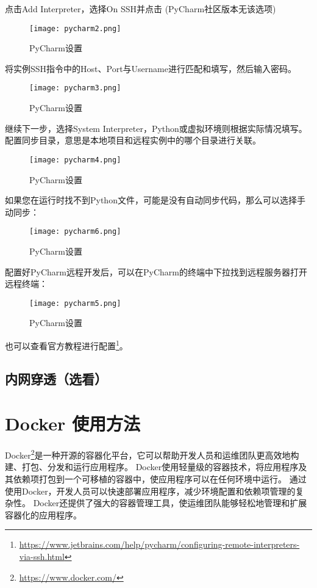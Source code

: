 \documentclass[lang=cn,a4paper,newtx]{elegantpaper}
\begin{document}
点击Add Interpreter，选择On SSH并点击 (PyCharm社区版本无该选项)
\begin{figure}[hbpt]
  \centering
  \texttt{[image: pycharm2.png]}
  \caption{PyCharm设置}
  \label{fig:pycharm2}
\end{figure}

将实例SSH指令中的Host、Port与Username进行匹配和填写，然后输入密码。
\begin{figure}[hbpt]
  \centering
  \texttt{[image: pycharm3.png]}
  \caption{PyCharm设置}
  \label{fig:pycharm3}
\end{figure}

\newpage
继续下一步，选择System Interpreter，Python或虚拟环境则根据实际情况填写。
配置同步目录，意思是本地项目和远程实例中的哪个目录进行关联。
\begin{figure}[hbpt]
  \centering
  \texttt{[image: pycharm4.png]}
  \caption{PyCharm设置}
  \label{fig:pycharm4}
\end{figure}

如果您在运行时找不到Python文件，可能是没有自动同步代码，那么可以选择手动同步：
\begin{figure}[hbpt]
  \centering
  \texttt{[image: pycharm6.png]}
  \caption{PyCharm设置}
  \label{fig:pycharm6}
\end{figure}

\newpage
配置好PyCharm远程开发后，可以在PyCharm的终端中下拉找到远程服务器打开远程终端：
\begin{figure}[hbpt]
  \centering
  \texttt{[image: pycharm5.png]}
  \caption{PyCharm设置}
  \label{fig:pycharm5}
\end{figure}

也可以查看官方教程进行配置\footnote{\url{https://www.jetbrains.com/help/pycharm/configuring-remote-interpreters-via-ssh.html}}。

\subsection{内网穿透（选看）}
\section{Docker 使用方法}
Docker\footnote{\url{https://www.docker.com/}}是一种开源的容器化平台，它可以帮助开发人员和运维团队更高效地构建、打包、分发和运行应用程序。
Docker使用轻量级的容器技术，将应用程序及其依赖项打包到一个可移植的容器中，使应用程序可以在任何环境中运行。
通过使用Docker，开发人员可以快速部署应用程序，减少环境配置和依赖项管理的复杂性。
Docker还提供了强大的容器管理工具，使运维团队能够轻松地管理和扩展容器化的应用程序。
\end{document}
